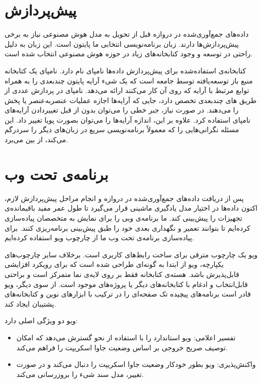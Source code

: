 \section{پیش‌پردازش}

داده‌های جمع‌آوری‌شده در دروازه قبل از تحویل به مدل هوش مصنوعی نیاز به برخی پیش‌پردازش‌ها دارند. زبان برنامه‌‌نویسی انتخابی ما پایتون است. این زبان به دلیل راحتی در توسعه و وجود کتابخانه‌های زیاد در حوزه هوش مصنوعی انتخاب شده است.


کتابخانه‌ی استفاده‌شده برای پیش‌پردازش داده‌ها نامپای نام دارد. نامپای یک کتابخانه منبع باز توسعه‌یافته توسط جامعه است که یک شیء آرایه پایتون چندبعدی را به همراه توابع مرتبط با آرایه که روی آن کار می‌کنند ارائه می‌دهد. نامپای در پردازش عددی از طریق های چندبعدی تخصص دارد، جایی که آرایه‌ها اجازه عملیات عنصربه‌عنصر یا پخش را می‌دهند. در صورت نیاز، جبر خطی را می‌توان بدون از قبل تغییردادن آرایه‌های نامپای استفاده کرد. علاوه بر این، اندازه آرایه‌ها را می‌توان بصورت پویا تغییر داد. این مسئله نگرانی‌هایی را که معمولاً برنامه‌نویسی سریع در زبان‌های دیگر را سردرگم می‌کند، از بین می‌برد\cite{bressert2012scipy,harris2020array}.

\section{برنامه‌ی تحت وب}

پس از دریافت داده‌های جمع‌آوری‌شده در دروازه و انجام مراحل پیش‌پردازش لازم، اکنون داده‌ها در اختیار مدل یادگیری ماشینی قرار می‌گیرد تا طول عمر مفید باقیمانده‌ی تجهیزات را پیش‌بینی کند. ما برنامه‌ی وبی را برای نمایش به متخصصان پیاده‌سازی کرده‌ایم تا بتوانند تعمیر و نگهداری بعدی خود را طبق پیش‌بینی برنامه‌ریزی کنند. برای پیاده‌سازی برنامه‌ی تحت وب ما از چارچوب ویو استفاده کرده‌ایم.


ویو یک چارچوب مترقی برای ساخت رابط‌های کاربری است. برخلاف سایر چارچوب‌های یکپارچه، ویو از ابتدا به گونه‌ای طراحی شده است که برای رویکرد افزایشی قابل‌پذیرش باشد. هسته‌ی کتابخانه فقط بر روی لایه‌ی نما متمرکز است و براحتی قابل‌انتخاب و ادغام با کتابخانه‌های دیگر یا پروژه‌های موجود است. از سوی دیگر، ویو قادر است برنامه‌های پیچیده تک صفحه‌ای را در ترکیب با ابزارهای نوین و کتابخانه‌های پشتیبان ایجاد کند\cite{vue}.

ویو دو ویژگی اصلی دارد:
\begin{itemize}
\item تفسیر اعلامی: ویو  استاندارد را با استفاده از نحو  گسترش می‌دهد که امکان توصیف صریح خروجی  بر اساس وضعیت جاوا اسکریپت را فراهم می‌کند.
\item واکنش‌پذیری: ویو بطور خودکار وضعیت جاوا اسکریپت را دنبال می‌کند و در صورت تغییر، مدل سند شیء را بروزرسانی می‌کند.
\end{itemize}

